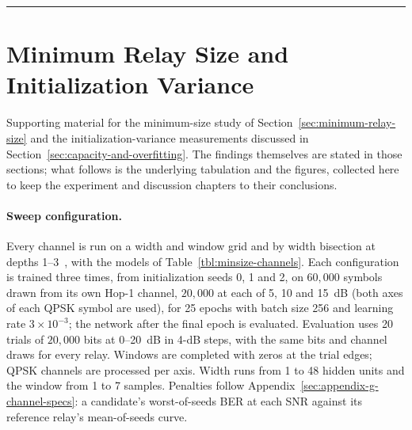 \begin{center}\rule{0.5\linewidth}{0.5pt}\end{center}


\section{Minimum Relay Size and Initialization Variance}\label{sec:appendix-f-minimum-size}

Supporting material for the minimum-size study of Section~\ref{sec:minimum-relay-size} and the initialization-variance measurements discussed in Section~\ref{sec:capacity-and-overfitting}. The findings themselves are stated in those sections; what follows is the underlying tabulation and the figures, collected here to keep the experiment and discussion chapters to their conclusions.

\paragraph{Sweep configuration.} Every channel is run on a width and window grid and by width bisection at depths 1--3~, with the models of Table~\ref{tbl:minsize-channels}. Each configuration is trained three times, from initialization seeds 0, 1 and 2, on $60{,}000$ symbols drawn from its own Hop-1 channel, $20{,}000$ at each of 5, 10 and 15~dB (both axes of each QPSK symbol are used), for 25 epochs with batch size 256 and learning rate $3\times10^{-3}$; the network after the final epoch is evaluated. Evaluation uses 20 trials of $20{,}000$ bits at 0--20~dB in 4-dB steps, with the same bits and channel draws for every relay. Windows are completed with zeros at the trial edges; QPSK channels are processed per axis. Width runs from 1 to 48 hidden units and the window from 1 to 7 samples. Penalties follow Appendix~\ref{sec:appendix-g-channel-specs}: a candidate's worst-of-seeds BER at each SNR against its reference relay's mean-of-seeds curve.


